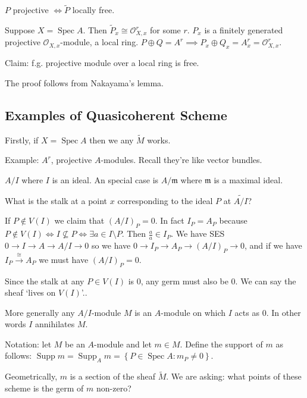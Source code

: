 \documentclass{article}
\theoremstyle{definition}
\begin{document}
    \(P\) projective \(\iff \widetilde{P}\) locally free.
    
    Suppose \(X = \operatorname{Spec} A\). Then \(\widetilde{P}_x \cong \mathcal{O}_{X,x}^r\) for some \(r\). \(P_x\) is a finitely generated projective \(\mathcal{O}_{X,x}\)-module, a local ring. \(P \oplus Q = A^r \implies P_x \oplus Q_x = A_x^r = \mathcal{O}_{X,x}^r\).

    Claim: f.g. projective module over a local ring is free.

    The proof follows from Nakayama's lemma.

    \subsection*{Examples of Quasicoherent Scheme}

    Firstly, if \(X = \operatorname{Spec} A\) then we any \(\widetilde{M}\) works.

    Example: \(A^r\), projective \(A\)-modules. Recall they're like vector bundles.

    \(A / I\) where \(I\) is an ideal. An special case is \(A / \mathfrak{m}\) where \(\mathfrak{m}\) is a maximal ideal.

    What is the stalk at a point \(x\) corresponding to the ideal \(P\) at \(\widetilde{A / I}\)?

    If \(P\notin V(I)\) we claim that \((A / I)_P = 0\). In fact \(I_P = A_P\) because \(P \notin V(I) \iff I \nsubseteq P \iff \exists a\in I \setminus P\). Then \(\frac{a}{a} \in I_P\). We have SES \(0 \to I \to A \to A / I \to 0\) so we have \(0 \to I_P \to A_P \to (A / I)_P \to 0\), and if we have \(I_P \xrightarrow{\cong} A_P\) we must have \((A / I)_P = 0\).
    
    Since the stalk at any \(P \in V(I)\) is \(0\), any germ must also be \(0\). We can say the sheaf `lives on \(V(I)\)'..

    More generally any \(A / I\)-module \(M\) is an \(A\)-module on which \(I\) acts as \(0\). In other words \(I\) annihilates \(M\).

    Notation: let \(M\) be an \(A\)-module and let \(m\in M\). Define the support of \(m\) as follows: \(\operatorname{Supp} m = \operatorname{Supp}_A m = \left\{ P \in \operatorname{Spec} A : m_P \neq 0 \right\} \).

    Geometrically, \(m\) is a section of the sheaf \(\widetilde{M}\). We are asking: what points of these scheme is the germ of \(m\) non-zero?
\end{document}
